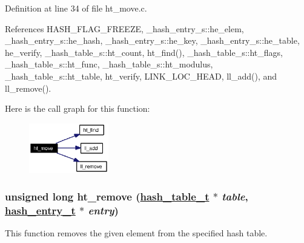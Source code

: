 Definition at line 34 of file ht\_\-move.c.

References HASH\_\-FLAG\_\-FREEZE, \_\-hash\_\-entry\_\-s::he\_\-elem, \_\-hash\_\-entry\_\-s::he\_\-hash, \_\-hash\_\-entry\_\-s::he\_\-key, \_\-hash\_\-entry\_\-s::he\_\-table, he\_\-verify, \_\-hash\_\-table\_\-s::ht\_\-count, ht\_\-find(), \_\-hash\_\-table\_\-s::ht\_\-flags, \_\-hash\_\-table\_\-s::ht\_\-func, \_\-hash\_\-table\_\-s::ht\_\-modulus, \_\-hash\_\-table\_\-s::ht\_\-table, ht\_\-verify, LINK\_\-LOC\_\-HEAD, ll\_\-add(), and ll\_\-remove().

Here is the call graph for this function:\begin{figure}[H]
\begin{center}
\leavevmode
\includegraphics[width=98pt]{group__dbprim__hash_ga12_cgraph}
\end{center}
\end{figure}
\hypertarget{group__dbprim__hash_ga13}{
\subsubsection[ht\_\-remove]{\setlength{\rightskip}{0pt plus 5cm}unsigned long ht\_\-remove (\hyperlink{struct__hash__table__s}{hash\_\-table\_\-t} $\ast$ {\em table}, \hyperlink{struct__hash__entry__s}{hash\_\-entry\_\-t} $\ast$ {\em entry})}}
\label{group__dbprim__hash_ga13}


This function removes the given element from the specified hash table.

